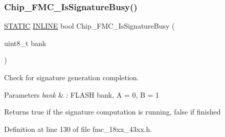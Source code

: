 \subsubsection{\texorpdfstring{Chip\+\_\+\+F\+M\+C\+\_\+\+Is\+Signature\+Busy()}{Chip\_FMC\_IsSignatureBusy()}}
{\footnotesize\ttfamily \hyperlink{group___l_p_c___types___public___macros_ga10b2d890d871e1489bb02b7e70d9bdfb}{S\+T\+A\+T\+IC} \hyperlink{spifi__18xx__43xx_8h_a2eb6f9e0395b47b8d5e3eeae4fe0c116}{I\+N\+L\+I\+NE} bool Chip\+\_\+\+F\+M\+C\+\_\+\+Is\+Signature\+Busy (\begin{DoxyParamCaption}\item[{uint8\+\_\+t}]{bank }\end{DoxyParamCaption})}



Check for signature generation completion. 


\begin{DoxyParams}{Parameters}
{\em bank} & \+: F\+L\+A\+SH bank, A = 0, B = 1 \\
\hline
\end{DoxyParams}
\begin{DoxyReturn}{Returns}
true if the signature computation is running, false if finished 
\end{DoxyReturn}


Definition at line 130 of file fmc\+\_\+18xx\+\_\+43xx.\+h.

